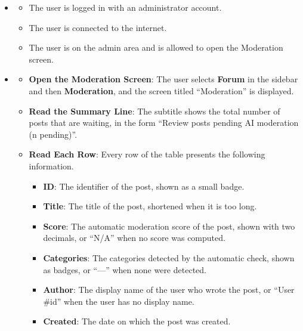 \begin{itemize}[leftmargin=1.6em,topsep=4pt,itemsep=3pt,parsep=0pt,label=$\bullet$]
    \item {}
        \begin{itemize}[leftmargin=2.2em,topsep=2pt,itemsep=3pt,parsep=0pt,label=$\circ$]
            \item The user is logged in with an administrator account.
            \item The user is connected to the internet.
            \item The user is on the admin area and is allowed to open the Moderation screen.
        \end{itemize}
    \item {}
        \begin{itemize}[leftmargin=2.2em,topsep=2pt,itemsep=3pt,parsep=0pt,label=$\circ$]
            \item \textbf{Open the Moderation Screen}: The user selects \textbf{Forum} in the sidebar and then \textbf{Moderation}, and the screen titled ``Moderation'' is displayed.
            \item \textbf{Read the Summary Line}: The subtitle shows the total number of posts that are waiting, in the form ``Review posts pending AI moderation (n pending)''.
            \item \textbf{Read Each Row}: Every row of the table presents the following information.
                \begin{itemize}[leftmargin=2.2em,topsep=2pt,itemsep=3pt,parsep=0pt,label=$\blacksquare$]
                    \item \textbf{ID}: The identifier of the post, shown as a small badge.
                    \item \textbf{Title}: The title of the post, shortened when it is too long.
                    \item \textbf{Score}: The automatic moderation score of the post, shown with two decimals, or ``N/A'' when no score was computed.
                    \item \textbf{Categories}: The categories detected by the automatic check, shown as badges, or ``---'' when none were detected.
                    \item \textbf{Author}: The display name of the user who wrote the post, or ``User \#id'' when the user has no display name.
                    \item \textbf{Created}: The date on which the post was created.

\end{itemize}
\end{itemize}
\end{itemize}
